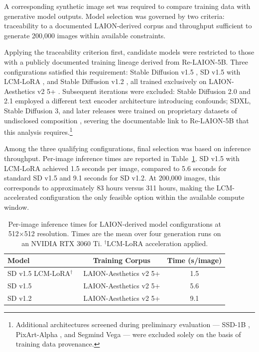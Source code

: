 A corresponding synthetic image set was required to compare training data with generative model outputs. Model selection was governed by two criteria: traceability to a documented LAION-derived corpus and throughput sufficient to generate 200,000 images within available constraints.

Applying the traceability criterion first, candidate models were restricted to those with a publicly documented training lineage derived from Re-LAION-5B. Three configurations satisfied this requirement: Stable Diffusion v1.5 \cite{StableDiffusion_2022_SD15modelcard}, SD v1.5 with LCM-LoRA \cite{StableDiffusion_2022_SD15modelcard, LCMLoRA_SDv15}, and Stable Diffusion v1.2 \cite{SD12_ModelCard}, all trained exclusively on LAION-Aesthetics v2 5+ \cite{Schuhmann_2022_LaionAesthetics}. Subsequent iterations were excluded: Stable Diffusion 2.0 and 2.1 employed a different text encoder architecture \cite{Cherti_2023_OpenCLIP} introducing confounds; SDXL, Stable Diffusion 3, and later releases were trained on proprietary datasets of undisclosed composition \cite{Podell_2023_SDXL, Esser_2024_SD3}, severing the documentable link to Re-LAION-5B that this analysis requires.\footnote{Additional architectures screened during preliminary evaluation --- SSD-1B \cite{SSD1B_ModelCard}, PixArt-Alpha \cite{PixArtAlpha_ModelCard}, and Segmind Vega \cite{SegmindVega_ModelCard} --- were excluded solely on the basis of training data provenance.}

Among the three qualifying configurations, final selection was based on inference throughput. Per-image inference times are reported in Table~\ref{tab:generative-model-inference-time}. SD v1.5 with LCM-LoRA achieved 1.5 seconds per image, compared to 5.6 seconds for standard SD v1.5 and 9.1 seconds for SD v1.2. At 200,000 images, this corresponds to approximately 83 hours versus 311 hours, making the LCM-accelerated configuration the only feasible option within the available compute window.

\begin{table}[htbp]
	\centering
	\footnotesize
	\begin{tabular}{lcc}
		\toprule
		\textbf{Model} & \textbf{Training Corpus} & \textbf{Time (s/image)} \\
		\midrule
		SD v1.5 LCM-LoRA$^\dagger$~\cite{StableDiffusion_2022_SD15modelcard, LCMLoRA_SDv15}
		               & LAION-Aesthetics v2 5+   & 1.5                     \\
		SD v1.5~\cite{StableDiffusion_2022_SD15modelcard}
		               & LAION-Aesthetics v2 5+   & 5.6                     \\
		SD v1.2~\cite{SD12_ModelCard}
		               & LAION-Aesthetics v2 5+   & 9.1                     \\
		\bottomrule
	\end{tabular}
	\caption{Per-image inference times for LAION-derived model configurations
		at 512$\times$512 resolution. Times are the mean over four generation runs
		on an NVIDIA RTX 3060 Ti. $^\dagger$LCM-LoRA acceleration applied.}
	\label{tab:generative-model-inference-time}
\end{table}


